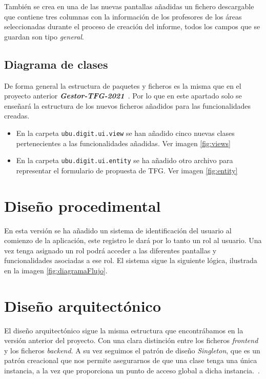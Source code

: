 También se crea en una de las nuevas pantallas añadidas un fichero descargable que contiene tres columnas con la información de los profesores de los áreas seleccionadas durante el proceso de creación del informe, todos los campos que se guardan son tipo \emph{general}.

\subsection{Diagrama de clases}

De forma general la estructura de paquetes y ficheros es la misma que en el proyecto anterior \textbf{\textit{Gestor-TFG-2021}}~\cite{Gestor-TFG-2021}. Por lo que en este apartado solo se enseñará la estructura de los nuevos ficheros añadidos para las funcionalidades creadas.

\begin{itemize}
	\item En la carpeta \texttt{ubu.digit.ui.view} se han añadido cinco nuevas clases pertenecientes a las funcionalidades añadidas. Ver imagen \ref{fig:views}
	
	
	\item En la carpeta \texttt{ubu.digit.ui.entity} se ha añadido otro archivo para representar el formulario de propuesta de TFG. Ver imagen \ref{fig:entity}
	
	
\end{itemize}

\section{Diseño procedimental}
En esta versión se ha añadido un sistema de identificación del usuario al comienzo de la aplicación, este registro le dará por lo tanto un rol al usuario. Una vez tenga asignado un rol podrá acceder a las diferentes pantallas y funcionalidades asociadas a ese rol.
El sistema sigue la siguiente lógica, ilustrada en la imagen \ref{fig:diagramaFlujo}.


\section{Diseño arquitectónico}

El diseño arquitectónico sigue la misma estructura que encontrábamos en la versión anterior del proyecto. Con una clara distinción entre los ficheros \emph{frontend} y los ficheros \emph{backend}.
A su vez seguimos el patrón de diseño \emph{Singleton}, que es un patrón creacional que nos permite asegurarnos de que una clase tenga una única instancia, a la vez que proporciona un punto de acceso global a dicha instancia.~\cite{Singleton}.
